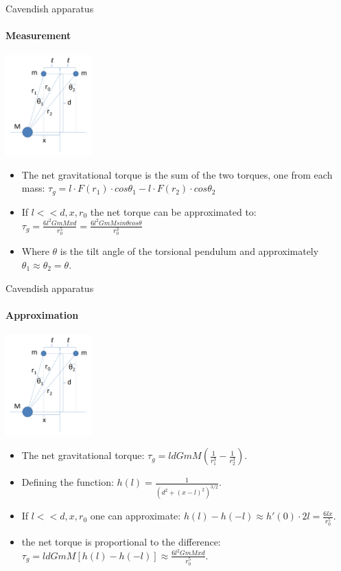 \documentclass{beamer}
\begin{document}
\begin{frame}{Cavendish apparatus}
\framesubtitle{Measurement}
	\begin{center}		
		\includegraphics[width=0.25\textwidth,keepaspectratio]{Cavendish apparatus.PNG}
    \end{center}
	\begin{itemize}
		\item The net gravitational torque is the sum of the two torques, one from each mass: $\tau_g = l \cdot F(r_1) \cdot cos\theta_1 - l \cdot F(r_2) \cdot cos\theta_2$
		\pause
		\item If $l<<d,x,r_0$ the net torque can be approximated to: $\tau_g =  \frac{6l^2GmMxd} {r_0^5} = \frac{6l^2GmM sin\theta cos\theta}{r_0^3}$
		\item Where $\theta$ is the tilt angle of the torsional pendulum and approximately $\theta_1 \approx \theta_2 = \theta$.
	\end{itemize}
\end{frame}
\begin{frame}{Cavendish apparatus}
	\framesubtitle{Approximation}
	\begin{center}		
		\includegraphics[width=0.25\textwidth,keepaspectratio]{Cavendish apparatus.PNG}
    \end{center}
	\begin{itemize}
		\item The net gravitational torque: $\tau_g =  l d GmM(\frac{1}{r_1^3} - \frac{1}{r_2^3})$.
		\item Defining the function: $h(l) = \frac{1}{(d^2 +(x-l)^2)^{3/2}}$.
		\item If $l<<d,x,r_0$ one can approximate: $h(l)-h(-l)\approx h'(0)\cdot 2l = \frac{6lx}{r_0^5}$.
		\item the net torque is proportional to the difference: $\tau_g = l d GmM[h(l)-h(-l)]\approx \frac{6l^2GmMxd} {r_0^5}$.
	\end{itemize}
\end{frame}
\end{document}

